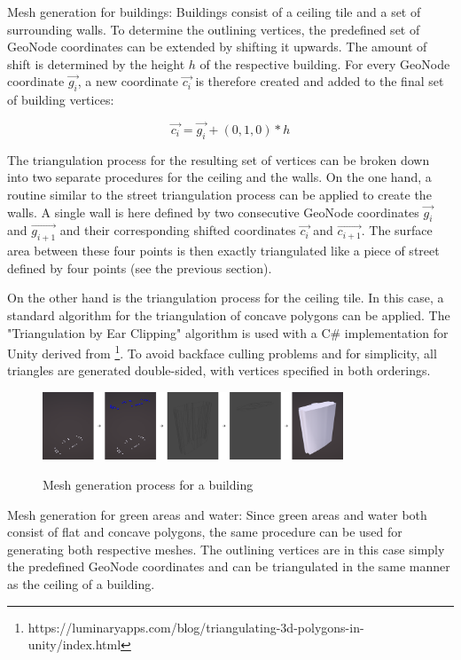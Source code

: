 Mesh generation for buildings: Buildings consist of a ceiling tile and a set of surrounding walls. To determine the outlining vertices, the predefined set of GeoNode coordinates can be extended by shifting it upwards. The amount of shift is determined by the height $h$ of the respective building. For every GeoNode coordinate $\vec{g_{i}}$, a new coordinate $\vec{c_{i}}$ is therefore created and added to the final set of building vertices:

\[\vec{c_{i}} = \vec{g_{i}} + (0, 1, 0) * h\]

The triangulation process for the resulting set of vertices can be broken down into two separate procedures for the ceiling and the walls. On the one hand, a routine similar to the street triangulation process can be applied to create the walls. A single wall is here defined by two consecutive GeoNode coordinates $\vec{g_{i}}$ and $\vec{g_{i + 1}}$ and their corresponding shifted coordinates $\vec{c_{i}}$ and $\vec{c_{i + 1}}$. The surface area between these four points is then exactly triangulated like a piece of street defined by four points (see the previous section).

On the other hand is the triangulation process for the ceiling tile. In this case, a standard algorithm for the triangulation of concave polygons can be applied. The "Triangulation by Ear Clipping" \cite{triangulation_by_ear_clipping} algorithm is used with a C\# implementation for Unity derived from \footnote{https://luminaryapps.com/blog/triangulating-3d-polygons-in-unity/index.html}. To avoid backface culling problems and for simplicity, all triangles are generated double-sided, with vertices specified in both orderings.

\begin{figure}[H]
	\centering
	\includegraphics[width=0.8\textwidth]{images/building_mesh_generation.png}\\
	\caption{Mesh generation process for a building}
\end{figure}

Mesh generation for green areas and water: Since green areas and water both consist of flat and concave polygons, the same procedure can be used for generating both respective meshes. The outlining vertices are in this case simply the predefined GeoNode coordinates and can be triangulated in the same manner as the ceiling of a building.

